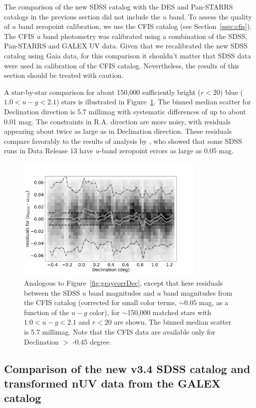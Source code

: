 The comparison of the new SDSS catalog with the DES and Pan-STARRS catalogs in the previous
section did not include the $u$ band. To assess the quality of $u$ band zeropoint calibration, 
we use the CFIS catalog (see Section~\ref{ssec:cfis}). The CFIS $u$ band photometry was 
calibrated using a combination of the SDSS, Pan-STARRS and GALEX UV data. Given that
we recalibrated the new SDSS catalog using Gaia data, for this comparison it shouldn't 
matter that SDSS data were used in calibration of the CFIS catalog. Nevertheless, the
results of this section should be treated with caution. 

A star-by-star comparison for about 150,000 sufficiently bright ($r<20$) blue ($1.0 <u-g < 2.1$) 
stars is illustrated in Figure~\ref{fig:CFIS}. The binned median scatter for Declination direction is 
5.7 millimag with systematic differences of up to about 0.01 mag. The constraints in R.A. direction 
are more noisy, with residuals appearing about twice as large as in Declination direction. 
These residuals compare favorably to the results of analysis by \cite{2017ApJ...848..128I}, 
who showed that some SDSS runs in Data Release 13 have $u$-band zeropoint errors as large
as 0.05 mag. 

 
\begin{figure}[th!]
    \centering\includegraphics[width=9cm]{figures/colorResidCFISug_Dec_Hess.png} 
\caption{Analogous to Figure~\ref{fig:graycorrDec}, except that here residuals 
between the SDSS $u$ band magnitudes and $u$ band magnitudes from the CFIS
catalog (corrected for small color terms, $\sim0.05$ mag, as a function of the $u-g$ color),
for $\sim$150,000 matched stars with $1.0 <u-g < 2.1$ and $r<20$ are shown. 
The binned median scatter is 5.7 millimag. Note that the CFIS data are available
only for Declination $>$ -0.45 degree.}
\label{fig:CFIS}
\end{figure}

\subsection{Comparison of the new v3.4 SDSS catalog and transformed nUV data from the GALEX catalog  \label{sec:Galextest}} 

